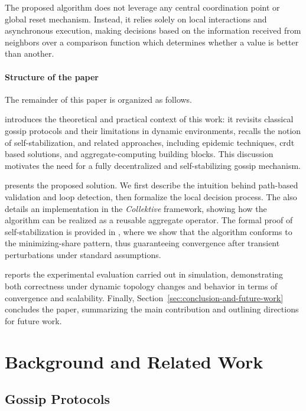 \documentclass[runningheads]{llncs}
\newcommand{\ck}{\emph{Collektive}}
\begin{document}
The proposed algorithm does not leverage any central coordination point or global reset mechanism.
%
Instead,
it relies solely on local interactions and asynchronous execution,
making decisions based on the information received from neighbors over a comparison function
which determines whether a value is better than another.

\paragraph{Structure of the paper}
The remainder of this paper is organized as follows.

 introduces the theoretical and practical context of this work:
it revisits classical gossip protocols and their limitations in dynamic environments,
recalls the notion of self-stabilization,
and related approaches, including epidemic techniques, \ac{crdt} based solutions,
and aggregate-computing building blocks.
%
This discussion motivates the need for a fully decentralized and self-stabilizing gossip mechanism.

 presents the proposed solution.
We first describe the intuition behind path-based validation and loop detection,
then formalize the local decision process.
%
The  also details an implementation in the \ck{} framework,
showing how the algorithm can be realized as a reusable aggregate operator.
%
The formal proof of self-stabilization is provided in ,
where we show that the algorithm conforms to the minimizing-share pattern,
thus guaranteeing convergence after transient perturbations under standard assumptions.

 reports the experimental evaluation carried out in simulation,
demonstrating both correctness under dynamic topology changes
and behavior in terms of convergence and scalability.
%
Finally, Section~\ref{sec:conclusion-and-future-work} concludes the paper,
summarizing the main contribution and outlining directions for future work.

\section{Background and Related Work}
\label{sec:background}

\subsection{Gossip Protocols}\label{subsec:gossip-protocols}
\end{document}
